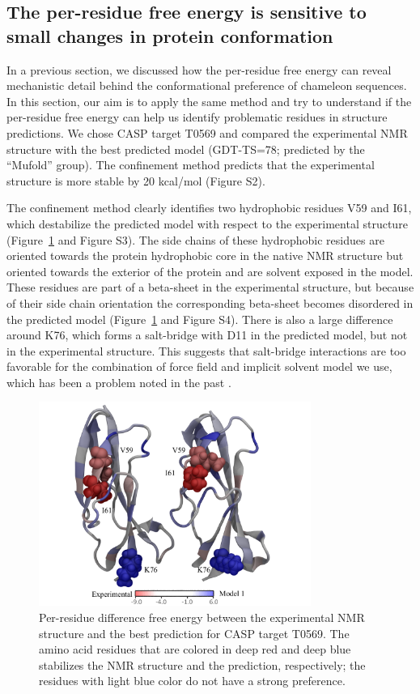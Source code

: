 \documentclass[12pt]{article}
\begin{document}
\subsection*{The per-residue free energy is sensitive to small changes in protein conformation}

In a previous section, we discussed how the per-residue free energy can reveal mechanistic detail behind the
conformational preference of chameleon sequences. In this section, our aim is to apply the same method and try to
understand if the per-residue free energy can help us identify problematic residues in structure predictions. We chose
CASP target T0569 and compared the experimental NMR structure with the best predicted model (GDT-TS=78; predicted by the
``Mufold'' group). The confinement method predicts that the experimental structure is more stable by 20 kcal/mol (Figure
S2).

The confinement method clearly identifies two hydrophobic residues V59 and I61, which destabilize the predicted model
with respect to the experimental structure (Figure~\ref{fig:T0569_per_residue} and Figure S3). The side chains of these
hydrophobic residues are oriented towards the protein hydrophobic core in the native NMR structure but oriented towards
the exterior of the protein and are solvent exposed in the model. These residues are part of a beta-sheet in the
experimental structure, but because of their side chain orientation the corresponding beta-sheet becomes disordered in
the predicted model (Figure~\ref{fig:T0569_per_residue} and Figure S4). There is also a large difference around K76,
which forms a salt-bridge with D11 in the predicted model, but not in the experimental structure. This suggests that
salt-bridge interactions are too favorable for the combination of force field and implicit solvent model we use, which
has been a problem noted in the past \cite{Roe2007}.

\begin{figure}
    \begin{center}
        \includegraphics[width=3.5in]{T0569_perres1.pdf}
    \end{center}
    \caption{Per-residue difference free energy between the experimental NMR structure and the best prediction for CASP
        target T0569. The amino acid residues that are colored in deep red and deep blue stabilizes the NMR structure
        and the prediction, respectively; the residues with light blue color do not have a strong preference.}
\label{fig:T0569_per_residue}
\end{figure}
\end{document}

